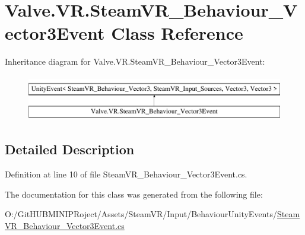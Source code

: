 \hypertarget{class_valve_1_1_v_r_1_1_steam_v_r___behaviour___vector3_event}{}\section{Valve.\+V\+R.\+Steam\+V\+R\+\_\+\+Behaviour\+\_\+\+Vector3\+Event Class Reference}
\label{class_valve_1_1_v_r_1_1_steam_v_r___behaviour___vector3_event}
Inheritance diagram for Valve.\+V\+R.\+Steam\+V\+R\+\_\+\+Behaviour\+\_\+\+Vector3\+Event\+:\begin{figure}[H]
\begin{center}
\leavevmode
\includegraphics[height=2.000000cm]{class_valve_1_1_v_r_1_1_steam_v_r___behaviour___vector3_event}
\end{center}
\end{figure}


\subsection{Detailed Description}


Definition at line 10 of file Steam\+V\+R\+\_\+\+Behaviour\+\_\+\+Vector3\+Event.\+cs.



The documentation for this class was generated from the following file\+:\begin{DoxyCompactItemize}
\item 
O\+:/\+Git\+H\+U\+B\+M\+I\+N\+I\+P\+Roject/\+Assets/\+Steam\+V\+R/\+Input/\+Behaviour\+Unity\+Events/\mbox{\hyperlink{_steam_v_r___behaviour___vector3_event_8cs}{Steam\+V\+R\+\_\+\+Behaviour\+\_\+\+Vector3\+Event.\+cs}}\end{DoxyCompactItemize}
